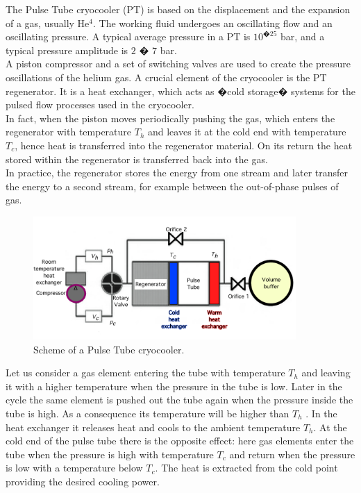 {The Pulse Tube cryocooler (PT) is based on the displacement and the expansion of a gas, usually He$^4$. The working fluid undergoes an oscillating flow and an oscillating pressure. A typical average pressure in a PT is $10^{�25}$ bar, and a typical pressure amplitude is $2$ � $7$ bar. \\
A piston compressor and a set of switching valves  are used to create the pressure oscillations of the helium gas.  A crucial element of the cryocooler is the  PT regenerator. It is a heat exchanger, which acts as �cold storage� systems for the  pulsed flow processes used in the cryocooler. \\
In fact, when the piston moves periodically pushing the gas, which enters the regenerator with temperature $T_h$ and leaves it  at the cold end with temperature $T_c$, hence heat is transferred into the regenerator material. On its return the heat stored within the regenerator is transferred back into the gas.\\
In practice, the regenerator  stores the energy from one stream and later transfer the energy to a second stream, for example between the out-of-phase pulses of gas. 
\FloatBarrier
\begin{figure}[H]
	\begin{center}
		\includegraphics[width=10cm]{./Sec_SiteInfra/Figures/PT_scheme.pdf}
		\caption{Scheme of a Pulse Tube cryocooler.}
		\label{fig:cryo_infrastructure_figure/PT_scheme}
	\end{center}
\end{figure}
Let us consider a gas element entering the tube with temperature $T_h$ and leaving it with a higher temperature when the pressure in the tube is low.   Later in the cycle the same element is pushed out the tube again when the pressure inside the tube is high. As a consequence its temperature will be higher than $T_h$ . In the heat exchanger  it releases heat and cools to the ambient temperature $T_h$.
At the cold end of the pulse tube there is the opposite effect: here gas elements enter the tube  when the pressure is high with temperature $T_c$ and return when the pressure is low with a temperature below $T_c$. The heat is extracted from the cold point providing the desired cooling power.\\
}
